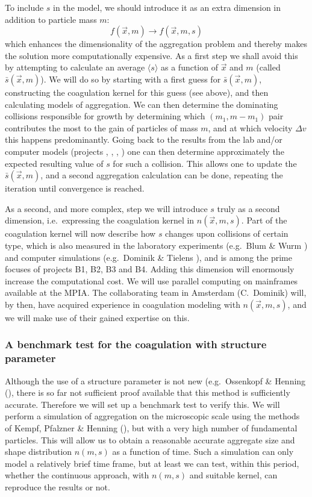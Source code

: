 To include $s$ in the model, we should introduce it as an extra dimension in
addition to particle mass $m$:
\begin{equation}
f(\vec x,m) \rightarrow f(\vec x,m,s)
\end{equation}
which enhances the dimensionality of the aggregation problem and thereby
makes the solution more computationally expensive. As a first step we shall
avoid this by attempting to calculate an average $\langle s\rangle$ as a
function of $\vec x$ and $m$ (called $\bar s(\vec x,m)$). We will do so by
starting with a first guess for $\bar s(\vec x,m)$, constructing the
coagulation kernel for this guess (see above), and then calculating models
of aggregation. We can then determine the dominating collisions responsible
for growth by determining which $(m_1,m-m_1)$ pair contributes the most to
the gain of particles of mass $m$, and at which velocity $\Delta v$ this
happens predominantly. Going back to the results from the lab and/or
computer models (projects \projblum{}, \projwurm{}, \projblumtrie{},
\projkley{}) one can then determine approximately the expected resulting
value of $s$ for such a collision. This allows one to update the $\bar
s(\vec x,m)$, and a second aggregation calculation can be done, repeating
the iteration until convergence is reached.

As a second, and more complex, step we will introduce $s$ truly as a second
dimension, i.e.~expressing the coagulation kernel in $n(\vec x,m,s)$.  Part
of the coagulation kernel will now describe how $s$ changes upon collisions
of certain type, which is also measured in the laboratory experiments
(e.g.~Blum \& Wurm ) and computer simulations (e.g.~Dominik \&
Tielens ), and is among the prime focuses of projects B1, B2, B3
and B4. Adding this dimension will enormously increase the computational
cost. We will use parallel computing on mainframes available at the MPIA.
The collaborating team in Amsterdam (C.~Dominik) will, by then, have
acquired experience in coagulation modeling with $n(\vec x,m,s)$, and we
will make use of their gained expertise on this.

\subsubsection{A benchmark test for the coagulation with structure parameter}
Although the use of a structure parameter is not new (e.g.~Ossenkopf 
\& Henning (), there is so far not sufficient proof 
available that this method is sufficiently accurate. Therefore we will
set up a benchmark test to verify this. We will perform a 
simulation of aggregation on the microscopic scale using the methods
of Kempf, Pfalzner \& Henning (), but with a very
high number of fundamental particles. This will allow us to obtain a
reasonable accurate aggregate size and shape distribution $n(m,s)$ as
a function of time. Such a simulation can only model a relatively brief
time frame, but at least we can test, within this period, whether the
continuous approach, with $n(m,s)$ and suitable kernel, can reproduce 
the results or not. 


